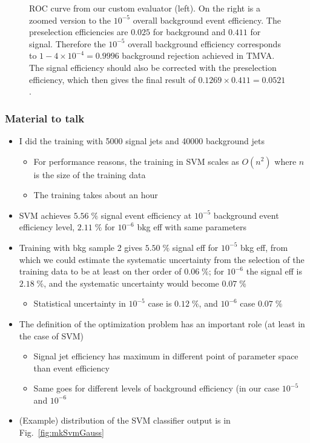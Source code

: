 \begin{figure}[h]
\begin{center}
\begin{minipage}{.3\textwidth}
    \end{minipage}
  \end{center}
  \caption{ROC curve from our custom evaluator (left). On the right is
    a zoomed version to the $10^{-5}$ overall background event
    efficiency. The preselection efficiencies are $0.025$ for
    background and $0.411$ for signal. Therefore the $10^{-5}$ overall
    background efficiency corresponds to $1-4\times 10^{-4}=0.9996$
    background rejection achieved in TMVA. The signal efficiency
    should also be corrected with the preselection efficiency, which
    then gives the final result of $0.1269\times 0.411 = 0.0521$.}
  \label{fig:mkRocEvent}
\end{figure}

\subsubsection{Material to talk}

\begin{itemize}
\item I did the training with 5000 signal jets and 40000 background
  jets
  \begin{itemize}
  \item For performance reasons, the training in SVM scales as
    $O(n^2)$ where $n$ is the size of the training data
  \item The training takes about an hour 
  \end{itemize}
\item SVM achieves $5.56\;\%$ signal event efficiency at $10^{-5}$
  background event efficiency level, $2.11\;\%$ for $10^{-6}$ bkg eff
  with same parameters%
\item Training with bkg sample 2 gives $5.50\;\%$ signal eff for
  $10^{-5}$ bkg eff, from which we could estimate the systematic
  uncertainty from the selection of the training data to be at least
  on ther order of $0.06\;\%$; for $10^{-6}$ the signal eff is
  $2.18\;\%$, and the systematic uncertainty would become $0.07\;\%$
  \begin{itemize}
  \item Statistical uncertainty in $10^{-5}$ case is $0.12\;\%$, and
    $10^{-6}$ case $0.07\;\%$
  \end{itemize}
\item The definition of the optimization problem has an important role
  (at least in the case of SVM)
  \begin{itemize}
  \item Signal jet efficiency has maximum in different point of parameter space than event efficiency
  \item Same goes for different levels of background efficiency (in our case $10^{-5}$ and $10^{-6}$
  \end{itemize}
\item (Example) distribution of the SVM classifier output is in Fig.~\ref{fig:mkSvmGauss}
\end{itemize}

